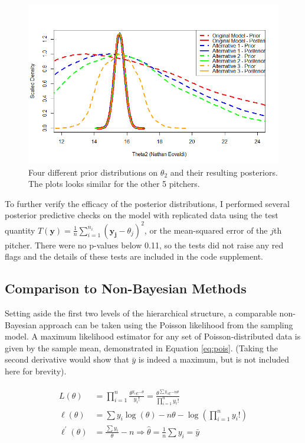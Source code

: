 \documentclass{article}
\begin{document}
\begin{figure}[h]
    \centering
    \includegraphics[scale=0.45]{figs/sensitivity.png}
    \caption{Four different prior distributions on $\theta_2$ and their resulting posteriors. The plots looks similar for the other 5 pitchers.}
    \label{fig:sens}
\end{figure}

To further verify the efficacy of the posterior distributions, I performed several posterior predictive checks on the model with replicated data using the test quantity $T(\boldsymbol{y}) = \frac{1}{n} \sum_{i=1}^{n_i} (\boldsymbol{y_j} - \theta_j)^2$, or the mean-squared error of the $j$th pitcher. There were no p-values below 0.11, so the tests did not raise any red flags and the details of these tests are included in the code supplement.

\subsection{Comparison to Non-Bayesian Methods}

Setting aside the first two levels of the hierarchical structure, a comparable non-Bayesian approach can be taken using the Poisson likelihood from the sampling model. A maximum likelihood estimator for any set of Poisson-distributed data is given by the sample mean, demonstrated in Equation \ref{eq:pois}. (Taking the second derivative would show that $\bar{y}$ is indeed a maximum, but is not included here for brevity).

\begin{align}
    \begin{split}
        L(\theta) &= \prod_{i=1}^n \frac{\theta^{y_i} e^{-\theta}}{y_i!} = \frac{\theta^{\sum y_i} e^{-n\theta}}{\prod_{i=1}^n y_i!} \\
        \ell(\theta) &= \sum y_i \log(\theta) - n\theta - \log(\prod_{i=1}^n y_i!) \\
        \ell^\prime(\theta) &= \frac{\sum y_i}{\theta} - n 
        \Longrightarrow \hat{\theta} = \frac{1}{n}\sum y_i = \bar{y}
        \label{eq:pois}
    \end{split}
\end{align}
\end{document}
